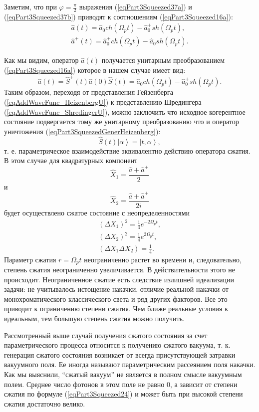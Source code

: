 Заметим, что при $\varphi = \frac{\pi}{2}$ выражения
(\ref{eqPart3Squeezed37a}) и (\ref{eqPart3Squeezed37b}) приводят к
соотношениям
(\ref{eqPart3Squeezed16a}):
\begin{eqnarray}
\hat{a}\left(t\right) = \hat{a}_0 ch \left(\Omega_p t \right) - 
\hat{a}^{+}_0 sh \left(\Omega_p t\right),
\nonumber \\
\hat{a}^{+}\left(t\right) = \hat{a}^{+}_0 ch \left(\Omega_p t \right) -
\hat{a}_0 sh \left(\Omega_p t\right).
\nonumber
\end{eqnarray}

Как мы видим, оператор $\hat{a}\left(t\right)$ получается унитарным
преобразованием (\ref{eqPart3Squeezed16a}) которое в нашем случае
имеет вид:
\begin{equation}
\hat{a}\left(t\right) =
\hat{S}^{+}\left(t\right)
\hat{a}\left(0\right)
\hat{S}\left(t\right) =
\hat{a}_0 ch \left(\Omega_p t \right) - 
\hat{a}^{+}_0 sh \left(\Omega_p t\right).
\label{eqPart3SqueezedGenerHeizenberg}
\end{equation}
Таким образом, переходя от представления Гейзенберга
(\ref{eqAddWaveFunc_HeizenbergU})
к представлению Шредингера (\ref{eqAddWaveFunc_ShredingerU}), можно
заключить что исходное когерентное состояние подвергается тому же
унитарному преобразованию что и оператор уничтожения
(\ref{eqPart3SqueezedGenerHeizenberg}):
\begin{equation}
\hat{S}\left(t\right)
\left|\alpha\right> =
\left|t, \alpha\right>,
\nonumber
\end{equation}
т. е. параметрическое взаимодействие эквивалентно действию оператора
сжатия. В этом случае для
квадратурных компонент 
\[
\hat{X}_1 = \frac{\hat{a} + \hat{a}^{+}}{2}
\]
и
\[
\hat{X}_2 = \frac{\hat{a} + \hat{a}^{+}}{2i}
\]
будет осуществлено сжатое состояние с неопределенностями 
\begin{eqnarray}
\left(\Delta X_1\right)^2 = 
\frac{1}{4}e^{-2 \Omega_p t},
\nonumber \\
\left(\Delta X_2\right)^2 = 
\frac{1}{4}e^{2 \Omega_p t},
\nonumber \\
\left(\Delta X_1 \Delta X_2\right) = 
\frac{1}{4}.
\nonumber
\end{eqnarray}
Параметр сжатия $r = \Omega_p t$ неограниченно растет во времени и,
следовательно, степень сжатия неограниченно увеличивается. В
действительности этого не происходит. Неограниченное сжатие есть
следствие излишней идеализации задачи: не учитывалось истощение
накачки, отличие реальной накачки от монохроматического классического
света и ряд других факторов. Все это приводит к ограничению степени
сжатия. Чем ближе реальные условия к идеальным, тем большую степень
сжатия можно получить. 

Рассмотренный выше случай получения сжатого состояния за счет
параметрического процесса относится к получению сжатого вакуума,
т. к. генерация сжатого состояния возникает от всегда присутствующей
затравки вакуумного поля. Ее иногда называют параметрическим
рассеянием поля накачки. Как мы выяснили, ``сжатый вакуум'' не является
в полном смысле вакуумным полем. Среднее число фотонов в этом поле не
равно 0, а зависит от степени сжатия по формуле (\ref{eqPart3Squeezed24}) и может быть при
высокой степени сжатия достаточно велико.

